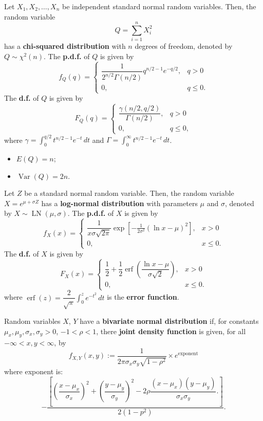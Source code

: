  Let \(X_1, X_2, \ldots, X_n\) be independent
standard normal random variables. Then, the random variable
\[Q = \sum_{i=1}^{n}X_i^2\]
has a \textbf{chi-squared distribution} with \(n\) degrees of freedom, denoted
by \(Q \sim \chi^2(n)\).
The \textbf{p.d.f.} of \(Q\) is given by
\[f_Q(q) = \begin{cases}
  \dfrac{1}{2^{n/2}\Gamma(n/2)}q^{n/2-1}e^{-q/2}, & q > 0 \\
  0, & q \leq 0.
\end{cases}\]
The \textbf{d.f.} of \(Q\) is given by
\[F_Q(q) = \begin{cases}
  \dfrac{\gamma(n/2,q/2)}{\Gamma(n/2)}, & q > 0 \\
  0, & q \leq 0,
\end{cases}\]
where \(\gamma = \int_{0}^{q/2}t^{n/2-1}e^{-t}\,dt\) and
\(\Gamma = \int_{0}^{\infty}t^{n/2-1}e^{-t}\,dt\).
\begin{multicols}{2} 
\begin{itemize}
  \item \(E(Q) = n\);
  \item \(\operatorname{Var}(Q) = 2n\).
\end{itemize}
\end{multicols}

 Let $Z$ be a standard normal random variable.
Then, the random variable $X = e^{\mu + \sigma Z}$ has a \textbf{log-normal
distribution} with parameters $\mu$ and $\sigma$, denoted by $X \sim
\operatorname{LN}(\mu, \sigma)$. The \textbf{p.d.f.} of $X$ is given by
\[f_X(x) = \begin{cases}
  \dfrac{1}{x\sigma\sqrt{2\pi}}\exp\left[-\frac{1}{2\sigma^2}(\ln x - \mu)^2 
  \right], & x > 0 \\
  0, & x \leq 0.
\end{cases}\]
The \textbf{d.f.} of $X$ is given by
\[F_X(x) = \begin{cases}
  \dfrac{1}{2} + \dfrac{1}{2}\operatorname{erf}\left(\dfrac{\ln x - \mu}{\sigma\sqrt{2}}\right), & x > 0 \\
  0, & x \leq 0.
\end{cases}\]
where \(\operatorname{erf}(z) = \dfrac{2}{\sqrt{\pi}}\int_{0}^{z}e^{-t^2}\,dt\)
is the \textbf{error function}.


 Random variables \(X\), \(Y\) have a
\textbf{bivariate normal distribution} if, for constants \(\mu_x, \mu_y,
\sigma_x, \sigma_y> 0\), \(-1 < \rho < 1\), there \textbf{joint density
function} is given, for all \(-\infty < x, y < \infty\), by
\[f_{X, Y}(x, y) := \dfrac{1}{2\pi\sigma_x\sigma_y\sqrt{1-\rho^2}} \times
e^\text{exponent}\]
where exponent is:
\[-\dfrac{\left[\left(\dfrac{x-\mu_x}{\sigma_x}\right)^2 +
\left(\dfrac{y-\mu_y}{\sigma_y}\right)^2 -
2\rho\dfrac{(x-\mu_x)(y-\mu_y)}{\sigma_x\sigma_y}.\right]}{2(1-p^2)}.\]

